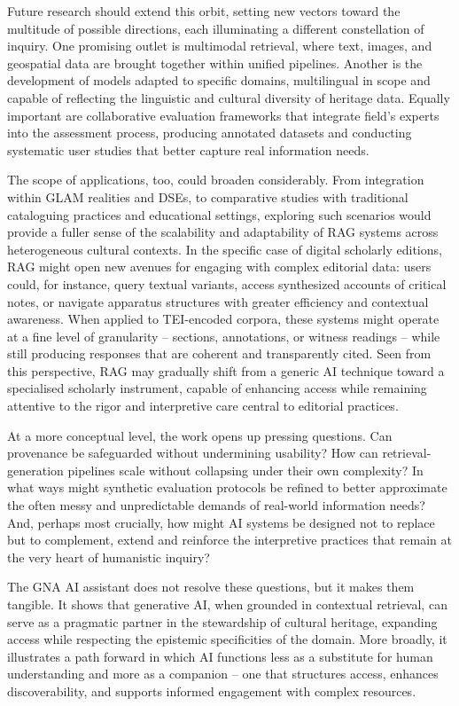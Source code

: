 \begin{spacing}{1.5}
Future research should extend this orbit, setting new vectors toward the multitude of possible directions, each illuminating a different constellation of inquiry. One promising outlet is multimodal retrieval, where text, images, and geospatial data are brought together within unified pipelines. Another is the development of models adapted to specific domains, multilingual in scope and capable of reflecting the linguistic and cultural diversity of heritage data. Equally important are collaborative evaluation frameworks that integrate field's experts into the assessment process, producing annotated datasets and conducting systematic user studies that better capture real information needs.

The scope of applications, too, could broaden considerably. From integration within GLAM realities and DSEs, to comparative studies with traditional cataloguing practices and educational settings, exploring such scenarios would provide a fuller sense of the scalability and adaptability of RAG systems across heterogeneous cultural contexts. In the specific case of digital scholarly editions, RAG might open new avenues for engaging with complex editorial data: users could, for instance, query textual variants, access synthesized accounts of critical notes, or navigate apparatus structures with greater efficiency and contextual awareness. When applied to TEI-encoded corpora, these systems might operate at a fine level of granularity -- sections, annotations, or witness readings -- while still producing responses that are coherent and transparently cited. Seen from this perspective, RAG may gradually shift from a generic AI technique toward a specialised scholarly instrument, capable of enhancing access while remaining attentive to the rigor and interpretive care central to editorial practices.

At a more conceptual level, the work opens up pressing questions. Can provenance be safeguarded without undermining usability? How can retrieval-generation pipelines scale without collapsing under their own complexity? In what ways might synthetic evaluation protocols be refined to better approximate the often messy and unpredictable demands of real-world information needs? And, perhaps most crucially, how might AI systems be designed not to replace but to complement, extend and reinforce the interpretive practices that remain at the very heart of humanistic inquiry?

The GNA AI assistant does not resolve these questions, but it makes them tangible. It shows that generative AI, when grounded in contextual retrieval, can serve as a pragmatic partner in the stewardship of cultural heritage, expanding access while respecting the epistemic specificities of the domain. More broadly, it illustrates a path forward in which AI functions less as a substitute for human understanding and more as a companion -- one that structures access, enhances discoverability, and supports informed engagement with complex resources.


\end{spacing}
